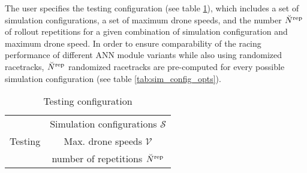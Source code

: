 The user specifies the testing configuration
(see table \ref{tab:test_config}),
which includes a set of simulation configurations,
a set of maximum drone speeds,
and the number $\num[\user]{\text{rep}}{}{}{}$ of rollout repetitions for a given
combination of simulation configuration and maximum drone speed.
In order to ensure comparability of the racing performance
of different ANN module variants while also using randomized racetracks,
$\num[\user]{\text{rep}}{}{}{}$ randomized racetracks are pre-computed 
for every possible simulation configuration 
(see table \ref{tab:sim_config_opts}).
\begin{table}[h]
    \caption{Testing configuration
    \label{tab:test_config}}
    \centering
    \begin{tabular}{|c|c|} 
        \hline
        \multirow{3}{*}{Testing}   
        &Simulation configurations $\mathcal{S}$
        \\\cline{2-2}
        &Max. drone speeds $\mathcal{V}$
        \\\cline{2-2}
        &number of repetitions $\num[\user]{\text{rep}}{}{}{}$
        \\\hline
    \end{tabular}
\end{table}

